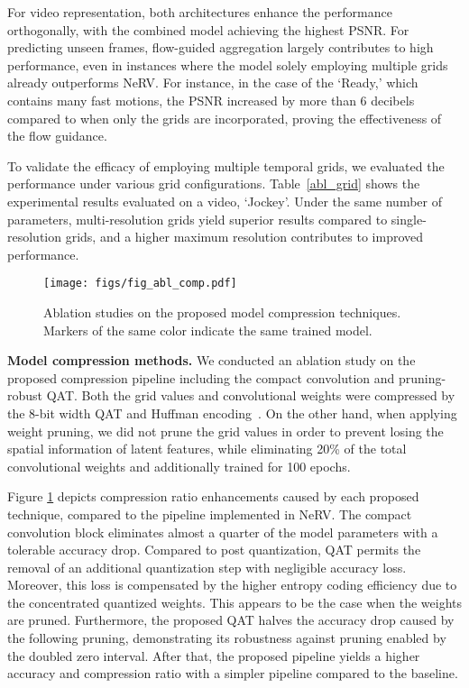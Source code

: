 \documentclass[sigconf]{acmart}
\begin{document}
For video representation, both architectures enhance the performance orthogonally, with the combined model achieving the highest PSNR.
For predicting unseen frames, flow-guided aggregation largely contributes to high performance, even in instances where the model solely employing multiple grids already outperforms NeRV. 
For instance, in the case of the ‘Ready,’ which contains many fast motions, the PSNR increased by more than 6 decibels compared to when only the grids are incorporated, proving the effectiveness of the flow guidance.

To validate the efficacy of employing multiple temporal grids, we evaluated the performance under various grid configurations. 
Table~\ref{abl_grid} shows the experimental results evaluated on a video, ‘Jockey’. 
Under the same number of parameters, multi-resolution grids yield superior results compared to single-resolution grids, and a higher maximum resolution contributes to improved performance.





\begin{figure}[t]
\texttt{[image: figs/fig\_abl\_comp.pdf]}
\caption{Ablation studies on the proposed model compression techniques. Markers of the  same color indicate the same trained model.}
\label{fig_abl_comp}
\end{figure}

\noindent\textbf{Model compression methods.}
We conducted an ablation study on the proposed compression pipeline including the compact convolution and pruning-robust QAT.
Both the grid values and convolutional weights were compressed by the 8-bit width QAT and Huffman encoding~\cite{huffman}.
On the other hand, when applying weight pruning, we did not prune the grid values in order to prevent losing the spatial information of latent features, while eliminating 20\% of the total convolutional weights and additionally trained for 100 epochs.

Figure \ref{fig_abl_comp} depicts compression ratio enhancements caused by each proposed technique, compared to the pipeline implemented in NeRV.
The compact convolution block eliminates almost a quarter of the model parameters with a tolerable accuracy drop.
Compared to post quantization, QAT permits the removal of an additional quantization step with negligible accuracy loss. 
Moreover, this loss is compensated by the higher entropy coding efficiency due to the concentrated quantized weights.
This appears to be the case when the weights are pruned.
Furthermore, the proposed QAT halves the accuracy drop caused by the following pruning, demonstrating its robustness against pruning enabled by the doubled zero interval.
After that, the proposed pipeline yields a higher accuracy and compression ratio with a simpler pipeline compared to the baseline.
\end{document}
